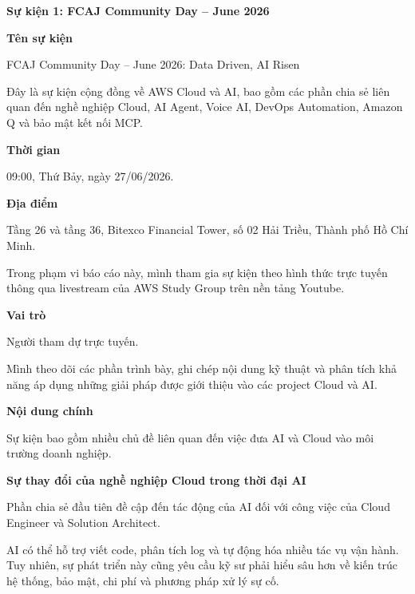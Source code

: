 \vspace{0.5em}\noindent\textbf{Sự kiện 1: FCAJ Community Day -- June
2026}\par

\vspace{0.5em}\noindent\textbf{Tên sự kiện}\par

FCAJ Community Day -- June 2026: Data Driven, AI Risen

Đây là sự kiện cộng đồng về AWS Cloud và AI, bao gồm các phần chia sẻ
liên quan đến nghề nghiệp Cloud, AI Agent, Voice AI, DevOps Automation,
Amazon Q và bảo mật kết nối MCP.

\vspace{0.5em}\noindent\textbf{Thời gian}\par

09:00, Thứ Bảy, ngày 27/06/2026.

\vspace{0.5em}\noindent\textbf{Địa điểm}\par

Tầng 26 và tầng 36, Bitexco Financial Tower, số 02 Hải Triều, Thành phố
Hồ Chí Minh.

Trong phạm vi báo cáo này, mình tham gia sự kiện theo hình thức trực
tuyến thông qua livestream của AWS Study Group trên nền tảng Youtube.

\vspace{0.5em}\noindent\textbf{Vai trò}\par

Người tham dự trực tuyến.

Mình theo dõi các phần trình bày, ghi chép nội dung kỹ thuật và phân
tích khả năng áp dụng những giải pháp được giới thiệu vào các project
Cloud và AI.

\vspace{0.5em}\noindent\textbf{Nội dung chính}\par

Sự kiện bao gồm nhiều chủ đề liên quan đến việc đưa AI và Cloud vào môi
trường doanh nghiệp.

\vspace{0.5em}\noindent\textbf{Sự thay đổi của nghề nghiệp Cloud trong thời đại
AI}\par

Phần chia sẻ đầu tiên đề cập đến tác động của AI đối với công việc của
Cloud Engineer và Solution Architect.

AI có thể hỗ trợ viết code, phân tích log và tự động hóa nhiều tác vụ
vận hành. Tuy nhiên, sự phát triển này cũng yêu cầu kỹ sư phải hiểu sâu
hơn về kiến trúc hệ thống, bảo mật, chi phí và phương pháp xử lý sự cố.

